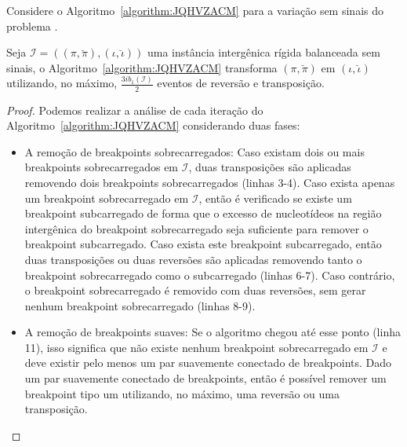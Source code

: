 Considere o Algoritmo~\ref{algorithm:JQHVZACM} para a variação sem sinais do problema \SbIRT{}.



\begin{lemma}\label{lemma:RNJHXOWZ}
Seja $\mathcal{I} = ((\pi,\breve\pi),(\iota,\breve\iota))$ uma instância intergênica rígida balanceada sem sinais, o Algoritmo~\ref{algorithm:JQHVZACM} transforma $(\pi,\breve\pi)$ em $(\iota,\breve\iota)$ utilizando, no máximo, $\frac{3ib_1(\mathcal{I})}{2}$ eventos de reversão e transposição.
\end{lemma}
\begin{proof}
Podemos realizar a análise de cada iteração do Algoritmo~\ref{algorithm:JQHVZACM} considerando duas fases:
\begin{itemize}
  \item A remoção de breakpoints sobrecarregados: Caso existam dois ou mais breakpoints sobrecarregados em $\mathcal{I}$, duas transposições são aplicadas removendo dois breakpoints sobrecarregados (linhas 3-4). Caso exista apenas um breakpoint sobrecarregado em $\mathcal{I}$, então é verificado se existe um breakpoint subcarregado de forma que o excesso de nucleotídeos na região intergênica do breakpoint sobrecarregado seja suficiente para remover o breakpoint subcarregado. Caso exista este breakpoint subcarregado, então duas transposições ou duas reversões são aplicadas removendo tanto o breakpoint sobrecarregado como o subcarregado (linhas 6-7). Caso contrário, o breakpoint sobrecarregado é removido com duas reversões, sem gerar nenhum breakpoint sobrecarregado (linhas 8-9).
  \item A remoção de breakpoints suaves: Se o algoritmo chegou até esse ponto (linha 11), isso significa que não existe nenhum breakpoint sobrecarregado em $\mathcal{I}$ e deve existir pelo menos um par suavemente conectado de breakpoints. Dado um par suavemente conectado de breakpoints, então é possível remover um breakpoint tipo um utilizando, no máximo, uma reversão ou uma transposição.
\end{itemize}

\end{proof}
